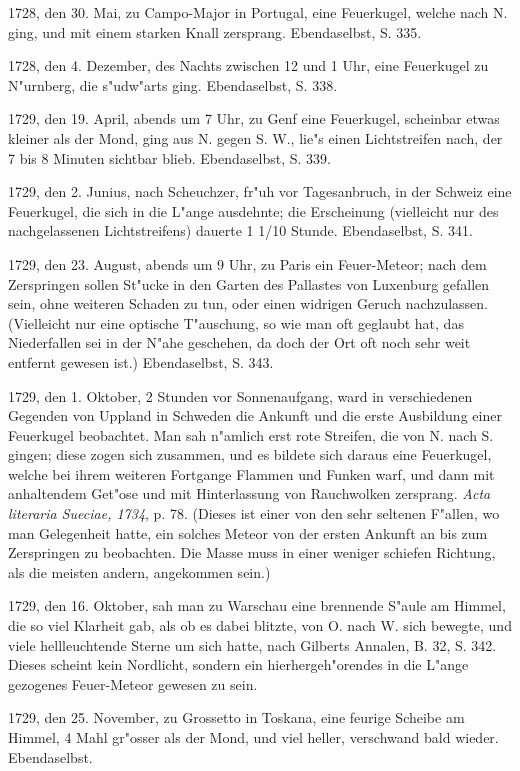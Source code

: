 \documentclass[a4paper, 11pt, oneside, polutonikogreek, german]{article}
\begin{document}
1728, den 30. Mai, zu Campo-Major in Portugal, eine Feuerkugel, welche nach N. ging, und mit einem starken Knall zersprang. Ebendaselbst, S. 335.

1728, den 4. Dezember, des Nachts zwischen 12 und 1 Uhr, eine Feuerkugel zu N"urnberg, die s"udw"arts ging. Ebendaselbst, S. 338.

1729, den 19. April, abends um 7 Uhr, zu Genf eine Feuerkugel, scheinbar etwas kleiner als der Mond, ging aus N. gegen S. W., lie"s einen Lichtstreifen nach, der 7 bis 8 Minuten sichtbar blieb. Ebendaselbst, S. 339.

1729, den 2. Junius, nach Scheuchzer, fr"uh vor Tagesanbruch, in der Schweiz eine Feuerkugel, die sich in die L"ange ausdehnte; die Erscheinung (vielleicht nur des nachgelassenen Lichtstreifens) dauerte 1 1/10 Stunde. Ebendaselbst, S. 341.

1729, den 23. August, abends um 9 Uhr, zu Paris ein Feuer-Meteor; nach dem Zerspringen sollen St"ucke in den Garten des Pallastes von Luxenburg gefallen sein, ohne weiteren Schaden zu tun, oder einen widrigen Geruch nachzulassen. (Vielleicht nur eine optische T"auschung, so wie man oft geglaubt hat, das Niederfallen sei in der N"ahe geschehen, da doch der Ort oft noch sehr weit entfernt gewesen ist.) Ebendaselbst, S. 343.

1729, den 1. Oktober, 2 Stunden vor Sonnenaufgang, ward in verschiedenen Gegenden von Uppland in Schweden die Ankunft und die erste Ausbildung einer Feuerkugel beobachtet. Man sah n"amlich erst rote Streifen, die von N. nach S. gingen; diese zogen sich zusammen, und es bildete sich daraus eine Feuerkugel, welche bei ihrem weiteren Fortgange Flammen und Funken warf, und dann mit anhaltendem Get"ose und mit Hinterlassung von Rauchwolken zersprang. \emph{Acta literaria Sueciae, 1734}, p. 78. (Dieses ist einer von den sehr seltenen F"allen, wo man Gelegenheit hatte, ein solches Meteor von der ersten Ankunft an bis zum Zerspringen zu beobachten. Die Masse muss in einer weniger schiefen Richtung, als die meisten andern, angekommen sein.)

1729, den 16. Oktober, sah man zu Warschau eine brennende S"aule am Himmel, die so viel Klarheit gab, als ob es dabei blitzte, von O. nach W. sich bewegte, und viele hellleuchtende Sterne um sich hatte, nach Gilberts Annalen, B. 32, S. 342. Dieses scheint kein Nordlicht, sondern ein hierhergeh"orendes in die L"ange gezogenes Feuer-Meteor gewesen zu sein.

1729, den 25. November, zu Grossetto in Toskana, eine feurige Scheibe am Himmel, 4 Mahl gr"osser als der Mond, und viel heller, verschwand bald wieder. Ebendaselbst.
\end{document}
